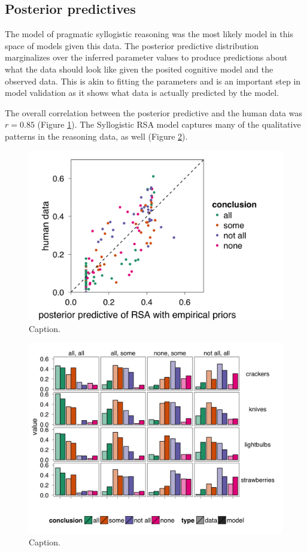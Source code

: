 \documentclass{llncs} %
\begin{document}
\subsection{Posterior predictives}

The model of pragmatic syllogistic reasoning was the most likely model in this space of models given this data. The posterior predictive distribution marginalizes over the inferred parameter values to produce predictions about what the data should look like given the posited cognitive model and the observed data. This is akin to fitting the parameters and is an important step in model validation as it shows what data is actually predicted by the model.

The overall correlation between the posterior predictive and the human data was $r = 0.85$ (Figure \ref{fig:scatterplot}). The Syllogistic RSA model captures many of the qualitative patterns in the reasoning data, as well (Figure \ref{fig:syllogismXdomain}). 

\begin{figure}
\centering
    \includegraphics[width=0.5\columnwidth]{figures/scatterplot}
    \caption{Caption.}
  \label{fig:scatterplot}
\end{figure}

\begin{figure}
\centering
    \includegraphics[width=\columnwidth]{figures/syllogismXdomain}
    \caption{Caption.}
  \label{fig:syllogismXdomain}
\end{figure}
\end{document}

